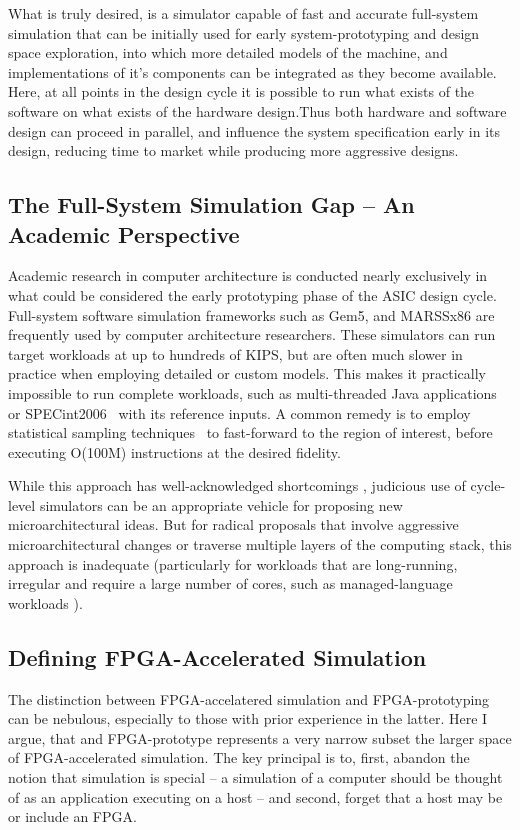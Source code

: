 What is truly desired, is a simulator capable of fast and accurate full-system
simulation that can be initially used for early system-prototyping and design
space exploration, into which more detailed models of the machine, and
implementations of it's components can be integrated as they become available.
Here, at all points in the design cycle it is possible to run what exists of
the software on what exists of the hardware design.Thus both hardware and
software design can proceed in parallel, and influence the system specification
early in its design, reducing time to market while producing more aggressive
designs.

\subsection{The Full-System Simulation Gap -- An Academic Perspective}

Academic research in computer architecture is conducted nearly exclusively in
what could be considered the early prototyping phase of the ASIC design cycle.
Full-system software simulation frameworks such as Gem5\cite{gem5}, and
MARSSx86\cite{marssx86} are frequently used by computer architecture
researchers. These simulators can run target workloads at up to hundreds of
KIPS, but are often much slower in practice when employing detailed or custom
models. This makes it practically impossible to run complete workloads, such as
multi-threaded Java applications or SPECint2006~\cite{spec} with its reference
inputs. A common remedy is to employ statistical sampling
techniques~\cite{smarts} to fast-forward to the region of interest, before
executing O(100M) instructions at the desired fidelity.

While this approach has well-acknowledged shortcomings \cite{gem5error},
judicious use of cycle-level simulators can be an appropriate vehicle for
proposing new microarchitectural ideas. But for radical proposals that involve
aggressive microarchitectural changes or traverse multiple layers of the
computing stack, this approach is inadequate (particularly for workloads that
are long-running, irregular and require a large number of cores, such as
managed-language workloads \cite{MicroSimPanel}).

\subsection{Defining FPGA-Accelerated Simulation}

The distinction between FPGA-accelatered simulation and FPGA-prototyping can be
nebulous, especially to those with prior experience in the latter. Here I
argue, that and FPGA-prototype represents a very narrow subset the larger space
of FPGA-accelerated simulation.  The key principal is to, first, abandon the
notion that simulation is special -- a simulation of a computer should
be thought of as an application executing on a host --  and second, forget that a
host may be or include an FPGA.

